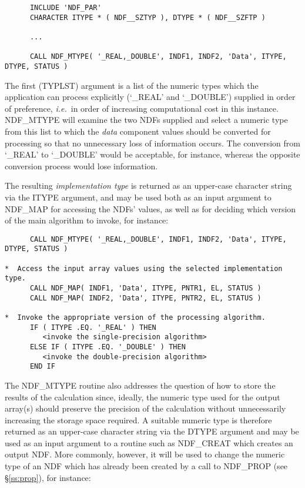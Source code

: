 \documentclass[twoside,11pt]{article}
\newcommand{\htmlref}[2]{#1}
\newcommand{\st}[1]{{\em{#1}}}
\begin{document}
\small
\begin{verbatim}
      INCLUDE 'NDF_PAR'
      CHARACTER ITYPE * ( NDF__SZTYP ), DTYPE * ( NDF__SZFTP )

      ...

      CALL NDF_MTYPE( '_REAL,_DOUBLE', INDF1, INDF2, 'Data', ITYPE, DTYPE, STATUS )
\end{verbatim}
\normalsize

The first (TYPLST) argument is a list of the numeric types which the
application can process explicitly (`\_REAL' and `\_DOUBLE') supplied in
order of preference, \st{i.e.}\ in order of increasing computational cost in
this instance. 
NDF\_MTYPE will examine the two NDFs supplied and select a numeric type from
this list to which the \st{data\/} component values should be converted for
processing so that no unnecessary loss of information occurs.
The conversion from `\_REAL' to `\_DOUBLE' would be acceptable, for
instance, whereas the opposite conversion process would lose information. 

The resulting \st{implementation type\/} is returned as an upper-case
character string via the ITYPE argument, and may be used both as an input
argument to \htmlref{NDF\_MAP}{NDF_MAP} for accessing the NDFs' values, as well as for deciding
which version of the main algorithm to invoke, for instance: 

\small
\begin{verbatim}
      CALL NDF_MTYPE( '_REAL,_DOUBLE', INDF1, INDF2, 'Data', ITYPE, DTYPE, STATUS )

*  Access the input array values using the selected implementation type.
      CALL NDF_MAP( INDF1, 'Data', ITYPE, PNTR1, EL, STATUS )
      CALL NDF_MAP( INDF2, 'Data', ITYPE, PNTR2, EL, STATUS )

*  Invoke the appropriate version of the processing algorithm.
      IF ( ITYPE .EQ. '_REAL' ) THEN
         <invoke the single-precision algorithm>
      ELSE IF ( ITYPE .EQ. '_DOUBLE' ) THEN
         <invoke the double-precision algorithm>
      END IF
\end{verbatim}
\normalsize

The NDF\_MTYPE routine also addresses the question of how to store the
results of the calculation since, ideally, the numeric type used for the
output array(s) should preserve the precision of the calculation without
unnecessarily increasing the storage space required. 
A suitable numeric type is therefore returned as an upper-case character
string via the DTYPE argument and may be used as an input argument to a
routine such as \htmlref{NDF\_CREAT}{NDF_CREAT} which creates an output NDF. 
More commonly, however, it will be used to change the numeric type of an NDF
which has already been created by a call to \htmlref{NDF\_PROP}{NDF_PROP} (see \S\ref{ss:prop}),
for instance: 
\end{document}
